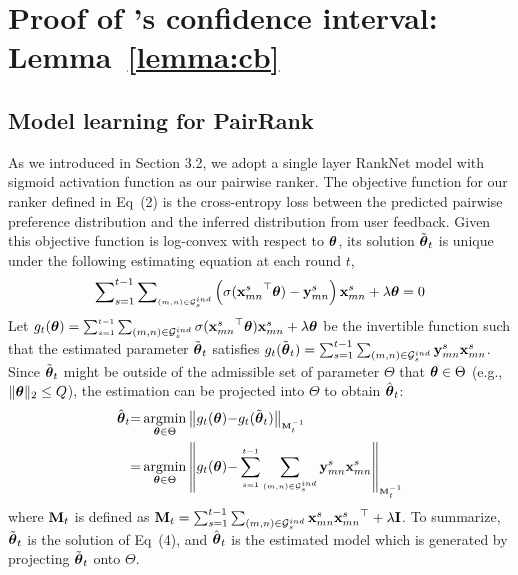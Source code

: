 \section{Proof of \model{}'s confidence interval: Lemma~\ref{lemma:cb}}


\subsection{Model learning for PairRank}
\label{sec:modellearning}

As we introduced in Section 3.2, we adopt a single layer RankNet model with sigmoid activation function as our pairwise ranker. The objective function for our ranker defined in Eq~(2) is the cross-entropy loss between the predicted pairwise preference distribution and the inferred distribution from user feedback. Given this objective function is log-convex with respect to $\boldsymbol{\theta}$, its solution $\tilde{\boldsymbol{\theta}}_t$ is unique under the following estimating equation at each round $t$,
\small
\begin{align}
\label{eqn:gradient}
    \sum\nolimits_{s=1}^{t-1}\sum\nolimits_{\scriptscriptstyle (m, n)\in\mathcal{G}_{s}^{ind}} \left(\sigma({{\mathbf{x}_{mn}^s}}^\top\boldsymbol{\theta}) - {\mathbf{y}_{mn}^s} \right){\mathbf{x}_{mn}^s}+ \lambda\boldsymbol{\theta} = 0
\end{align}
\normalsize
Let $g_t(\boldsymbol{\theta}) = \sum_{\scriptscriptstyle s=1}^{\scriptscriptstyle t-1}\sum_{(m, n) \in \mathcal{G}_s^{ind}}\sigma({{\mathbf{x}_{mn}^s}}^\top\boldsymbol{\theta}){\mathbf{x}_{mn}^s} + \lambda\boldsymbol{\theta}$ be the invertible function such that the estimated parameter $\tilde{\boldsymbol{\theta}}_t$ satisfies $g_t(\tilde{\boldsymbol{\theta}}_t) = \sum_{s=1}^{t-1}\sum_{(m, n)\in\mathcal{G}_{s}^{ind}}{\mathbf{y}_{mn}^s}{\mathbf{x}_{mn}^s}$. Since $\tilde{\boldsymbol{\theta}}_t$ might be outside of the admissible set of parameter $\Theta$ that $\boldsymbol{\theta} \in \Theta$ (e.g., $\Vert\boldsymbol{\theta}\Vert_2 \leq Q$), the estimation can be projected into $\Theta$ to obtain $\hat{\boldsymbol{\theta}}_t$:
\small
\begin{align}
\label{eq:opt-solution}
    \hat{\boldsymbol{\theta}}_t 
    &{=} \operatorname*{argmin}_{\boldsymbol{\theta} \in \Theta} \left\| g_t(\boldsymbol{\theta}) {-} g_t(\tilde{\boldsymbol{\theta}}_t)\right\|_{\scriptscriptstyle \mathbf{M}_t^{-1}} \\
    &{=} \operatorname*{argmin}_{\boldsymbol{\theta} \in \Theta} \left\| g_t(\boldsymbol{\theta}) {-} \sum_{\scriptscriptstyle s=1}^{\scriptscriptstyle t-1}\sum_{\scriptscriptstyle (m, n)\in\mathcal{G}_{s}^{ind}}{\mathbf{y}_{mn}^s}{\mathbf{x}_{mn}^s}\right\|_{\scriptscriptstyle \mathbf{M}_{t}^{-1}} \nonumber
\end{align}
\normalsize
where $\mathbf{M}_t$ is defined as $\mathbf{M}_t = \sum_{s =1}^{t-1}\sum_{(m, n) \in \mathcal{G}_{s}^{ind}}{\mathbf{x}_{mn}^s}{{\mathbf{x}_{mn}^s}}^\top + \lambda \mathbf{I}$. To summarize, $\tilde{\boldsymbol{\theta}}_t$ is the solution of Eq~(4), and $\hat{\boldsymbol{\theta}}_t$ is the estimated model which is generated by projecting $\tilde{\boldsymbol{\theta}}_t$ onto $\Theta$.

